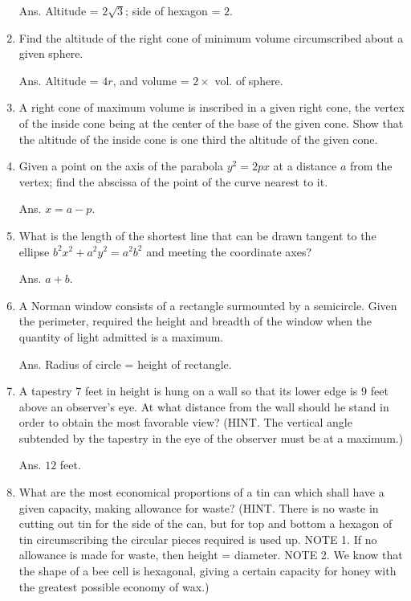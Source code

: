 \begin{enumerate}
Ans. Altitude = $2 \sqrt{3}$; side of hexagon = $2$.

\item
Find the altitude of the right cone of minimum volume circumscribed 
about a given sphere.

Ans. Altitude = $4r$, and volume = $2\times$ vol. of sphere.

\item
A right cone of maximum volume is inscribed in a given right cone, 
the vertex of the inside cone being at the center of the base of 
the given cone. Show that the altitude of the inside cone is one 
third the altitude of the given cone.

\item
Given a point on the axis of the parabola $y^2 = 2px$ at a distance 
$a$ from the vertex; find the abscissa of the point of the curve nearest to it.

Ans. $x = a - p$.

\item
What is the length of the shortest line that can be drawn 
tangent to the ellipse $b^2x^2 + a^2y^2 = a^2b^2$ and 
meeting the coordinate axes?

Ans. $a + b$.

\item
A Norman window consists of a rectangle surmounted by a 
semicircle. Given the perimeter, required the height and 
breadth of the window when the quantity of light admitted is a maximum.

Ans. Radius of circle = height of rectangle.

\item
A tapestry $7$ feet in height is hung on a wall so that its lower 
edge is $9$ feet above an observer's eye. At what distance from the 
wall should he stand in order to obtain the most favorable view?
(HINT. The vertical angle subtended by the tapestry in the eye of the 
observer must be at a maximum.)

Ans. $12$ feet.

\item
What are the most economical proportions of a tin can which shall have 
a given capacity, making allowance for waste?
(HINT. There is no waste in cutting out tin for the side of the can, but 
for top and bottom a hexagon of tin circumscribing the circular pieces 
required is used up.
NOTE 1. If no allowance is made for waste, then height = diameter.
NOTE 2. We know that the shape of a bee cell is hexagonal, giving a 
certain capacity for honey with the greatest possible economy of wax.)


\end{enumerate}
